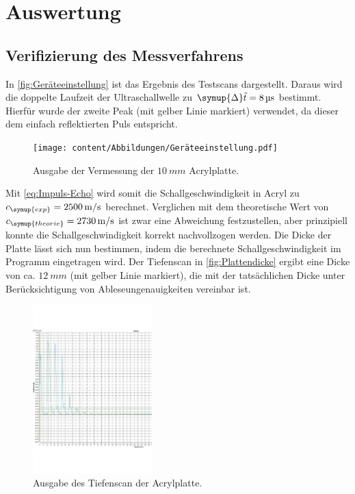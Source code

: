 \section{Auswertung}
\label{sec:Auswertung}

\subsection{Verifizierung des Messverfahrens}
\label{sec:Verifizierung des Messverfahrens}
In \autoref{fig:Geräteeinstellung} ist das Ergebnis des Testscans dargestellt. Daraus wird die doppelte Laufzeit der
Ultraschallwelle zu $\symup{\Delta}\tilde{t}=\qty{8}{\micro\second}$ bestimmt.
Hierfür wurde der zweite Peak (mit gelber Linie markiert) verwendet, da dieser dem einfach reflektierten Puls entspricht.

\begin{figure}[H]
  \centering
  \texttt{[image: content/Abbildungen/Geräteeinstellung.pdf]}
  \caption{Ausgabe der Vermessung der $\qty{10}{mm}$ Acrylplatte.}
  \label{fig:Geräteeinstellung}
\end{figure}

Mit \eqref{eq:Impuls-Echo} wird somit die Schallgeschwindigkeit in Acryl zu $c_{\symup{exp}}=\qty{2500}{\metre\per\second}$ berechnet.
Verglichen mit dem theoretische Wert von $c_{\symup{theorie}}=\qty{2730}{\metre\per\second}$\cite{c_Acryl} ist zwar eine Abweichung festzustellen,
aber prinzipiell konnte die Schallgeschwindigkeit korrekt nachvollzogen werden.
Die Dicke der Platte lässt sich nun bestimmen, indem die berechnete Schallgeschwindigkeit im Programm eingetragen wird.
Der Tiefenscan in \autoref{fig:Plattendicke} ergibt eine Dicke von ca. $\qty{12}{mm}$ (mit gelber Linie markiert), die mit der tatsächlichen
Dicke unter Berücksichtigung von Ableseungenauigkeiten vereinbar ist.

\begin{figure}[H]
  \centering
  \includegraphics[height=6.5cm]{content/Abbildungen/Plattendicke.pdf}
  \caption{Ausgabe des Tiefenscan der Acrylplatte.}
  \label{fig:Plattendicke}
\end{figure}

